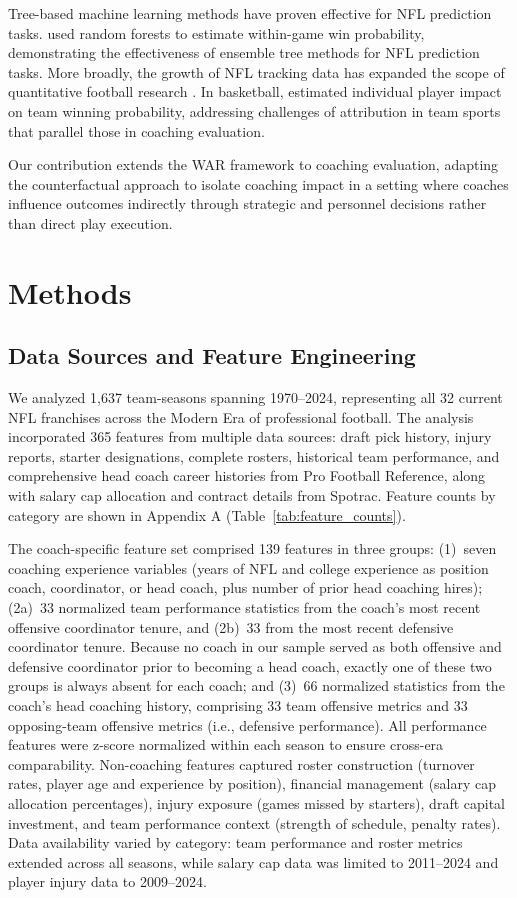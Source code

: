 \documentclass[USenglish]{article}
\theoremstyle{dgthm}
\theoremstyle{dgdef}
\begin{document}
Tree-based machine learning methods have proven effective for NFL prediction tasks. \citet{lock2014} used random forests to estimate within-game win probability, demonstrating the effectiveness of ensemble tree methods for NFL prediction tasks. More broadly, the growth of NFL tracking data has expanded the scope of quantitative football research \citep{lopez2020}. In basketball, \citet{deshpande2016} estimated individual player impact on team winning probability, addressing challenges of attribution in team sports that parallel those in coaching evaluation.

Our contribution extends the WAR framework to coaching evaluation, adapting the counterfactual approach to isolate coaching impact in a setting where coaches influence outcomes indirectly through strategic and personnel decisions rather than direct play execution.

\section{Methods}

\subsection{Data Sources and Feature Engineering}

We analyzed 1,637 team-seasons spanning 1970--2024, representing all 32 current NFL franchises across the Modern Era of professional football. The analysis incorporated 365 features from multiple data sources: draft pick history, injury reports, starter designations, complete rosters, historical team performance, and comprehensive head coach career histories from Pro Football Reference, along with salary cap allocation and contract details from Spotrac. Feature counts by category are shown in Appendix A (Table~\ref{tab:feature_counts}).

The coach-specific feature set comprised 139 features in three groups: (1)~seven coaching experience variables (years of NFL and college experience as position coach, coordinator, or head coach, plus number of prior head coaching hires); (2a)~33 normalized team performance statistics from the coach's most recent offensive coordinator tenure, and (2b)~33 from the most recent defensive coordinator tenure. Because no coach in our sample served as both offensive and defensive coordinator prior to becoming a head coach, exactly one of these two groups is always absent for each coach; and (3)~66 normalized statistics from the coach's head coaching history, comprising 33 team offensive metrics and 33 opposing-team offensive metrics (i.e., defensive performance). All performance features were z-score normalized within each season to ensure cross-era comparability. Non-coaching features captured roster construction (turnover rates, player age and experience by position), financial management (salary cap allocation percentages), injury exposure (games missed by starters), draft capital investment, and team performance context (strength of schedule, penalty rates). Data availability varied by category: team performance and roster metrics extended across all seasons, while salary cap data was limited to 2011--2024 and player injury data to 2009--2024.
\end{document}
